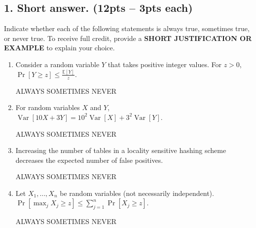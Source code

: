 \documentclass[10pt]{article}
\newcommand{\E}{\mathbb{E}}
\DeclareMathOperator{\Var}{Var}
\begin{document}
\subsection{1. Short answer. (\textbf{\small 12pts -- 3pts each})} 
Indicate whether each of the following statements is {always} true, {sometimes} true, or {never} true. To receive full credit, provide a \textbf{SHORT JUSTIFICATION OR EXAMPLE} to explain your choice. 
\begin{enumerate}[label=(\alph*)]
	\item Consider a random variable $Y$ that takes positive integer values. For $z > 0$,  $\Pr[Y \geq z] \leq \frac{\E[Y]}{z}$. 
	
	ALWAYS\hspace{1em} SOMETIMES\hspace{1em} NEVER\vspace{5em}
	
	\item For random variables $X$ and $Y$, $\Var[10X + 3Y] = 10^2\Var[X] + 3^2\Var[Y]$.
	
	ALWAYS\hspace{1em} SOMETIMES\hspace{1em} NEVER\vspace{5em}
	


	
	\item Increasing the number of tables in a locality sensitive hashing scheme decreases the expected number of false positives.
	
	ALWAYS\hspace{1em} SOMETIMES\hspace{1em} NEVER\vspace{5em}
	
	
	\item Let $X_1, \ldots, X_n$ be random variables (not necessarily independent). $\Pr\left[\max_j X_j \geq z\right] \leq \sum_{j=1}^n \Pr\left[X_j \geq z\right]$.
	
	ALWAYS\hspace{1em} SOMETIMES\hspace{1em} NEVER\vspace{5em} 
	

	
	

\end{enumerate}
\end{document}
